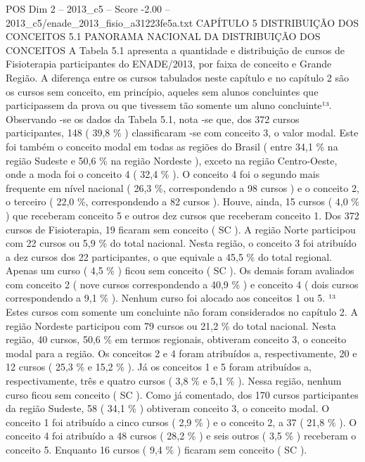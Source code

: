 \begin{textsample}{POS Dim 2 – 2013\_c5 – Score -2.00 – 2013\_c5/enade\_2013\_fisio\_a31223fe5a.txt}  \label{ex:f2_pos_371}
CAPÍTULO 5 DISTRIBUIÇÃO DOS CONCEITOS 5.1 PANORAMA NACIONAL DA DISTRIBUIÇÃO DOS CONCEITOS A Tabela 5.1 apresenta a quantidade e distribuição de cursos de Fisioterapia participantes do ENADE/2013, por faixa de conceito e Grande Região.
A diferença entre os cursos tabulados neste capítulo e no capítulo 2 são os cursos sem conceito, em princípio, aqueles sem alunos concluintes que participassem da prova ou que tivessem tão somente um aluno concluinte¹³.
Observando -se os dados da Tabela 5.1, nota -se que, dos 372 cursos participantes, 148 ( 39,8 \% ) classificaram -se com conceito 3, o valor modal.
Este foi também o conceito modal em todas as regiões do Brasil ( entre 34,1 \% na região Sudeste e 50,6 \% na região Nordeste ), exceto na região Centro-Oeste, onde a moda foi o conceito 4 ( 32,4 \% ).
O conceito 4 foi o segundo mais frequente em nível nacional ( 26,3 \%, correspondendo a 98 cursos ) e o conceito 2, o terceiro ( 22,0 \%, correspondendo a 82 cursos ).
Houve, ainda, 15 cursos ( 4,0 \% ) que receberam conceito 5 e outros dez cursos que receberam conceito 1.
Dos 372 cursos de Fisioterapia, 19 ficaram sem conceito ( SC ).
A região Norte participou com 22 cursos ou 5,9 \% do total nacional.
Nesta região, o conceito 3 foi atribuído a dez cursos dos 22 participantes, o que equivale a 45,5 \% do total regional.
Apenas um curso ( 4,5 \% ) ficou sem conceito ( SC ).
Os demais foram avaliados com conceito 2 ( nove cursos correspondendo a 40,9 \% ) e conceito 4 ( dois cursos correspondendo a 9,1 \% ).
Nenhum curso foi alocado aos conceitos 1 ou 5. ¹³ Estes cursos com somente um concluinte não foram considerados no capítulo 2.
A região Nordeste participou com 79 cursos ou 21,2 \% do total nacional.
Nesta região, 40 cursos, 50,6 \% em termos regionais, obtiveram conceito 3, o conceito modal para a região.
Os conceitos 2 e 4 foram atribuídos a, respectivamente, 20 e 12 cursos ( 25,3 \% e 15,2 \% ).
Já os conceitos 1 e 5 foram atribuídos a, respectivamente, três e quatro cursos ( 3,8 \% e 5,1 \% ).
Nessa região, nenhum curso ficou sem conceito ( SC ).
Como já comentado, dos 170 cursos participantes da região Sudeste, 58 ( 34,1 \% ) obtiveram conceito 3, o conceito modal.
O conceito 1 foi atribuído a cinco cursos ( 2,9 \% ) e o conceito 2, a 37 ( 21,8 \% ).
O conceito 4 foi atribuído a 48 cursos ( 28,2 \% ) e seis outros ( 3,5 \% ) receberam o conceito 5.
Enquanto 16 cursos ( 9,4 \% ) ficaram sem conceito ( SC ).

\end{textsample}
